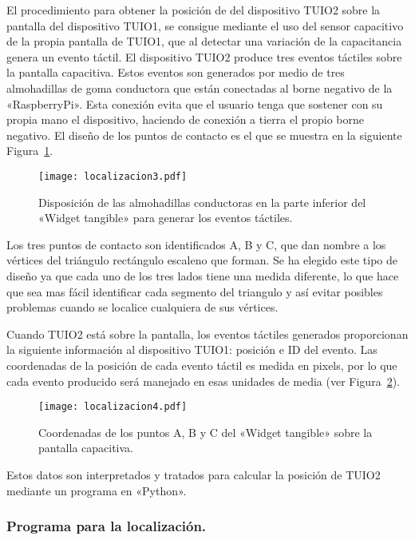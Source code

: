 El procedimiento para obtener la posición de del dispositivo TUIO2 sobre la pantalla del dispositivo TUIO1, se consigue mediante el uso del sensor capacitivo de la propia pantalla de TUIO1, que al detectar una variación de la capacitancia genera un evento táctil.
El dispositivo TUIO2 produce tres eventos táctiles sobre la pantalla capacitiva. Estos eventos son generados por medio de tres almohadillas de goma conductora que están conectadas al borne negativo de la «RaspberryPi». Esta conexión evita que el usuario tenga que sostener con su propia mano el dispositivo, haciendo de conexión a tierra el propio borne negativo.
El diseño de los puntos de contacto es el que se muestra en la siguiente Figura~\ref{fig:Localizacion3}.
\begin{figure}[!h]
\begin{center}
\texttt{[image: localizacion3.pdf]}
\caption{Disposición de las almohadillas conductoras en la parte inferior del «Widget tangible» para generar los eventos táctiles. }
\label{fig:Localizacion3}
\end{center}
\end{figure}
Los tres puntos de contacto son identificados A, B y C, que dan nombre a los vértices del triángulo rectángulo escaleno que forman. Se ha elegido este tipo de diseño ya que cada uno de los tres lados tiene una medida diferente, lo que hace que sea mas fácil identificar cada segmento del triangulo y así evitar posibles problemas cuando se localice cualquiera de sus vértices.

Cuando TUIO2 está sobre la pantalla, los eventos táctiles generados proporcionan la siguiente información al dispositivo TUIO1: posición e ID del evento. Las coordenadas de la posición de cada evento táctil es medida en pixels, por lo que cada evento producido será manejado en esas unidades de media (ver Figura~\ref{fig:Localizacion4}).\\
\begin{figure}[!h]
\begin{center}
\texttt{[image: localizacion4.pdf]}
\caption{Coordenadas de los puntos A, B y C del «Widget tangible» sobre la pantalla capacitiva. }
\label{fig:Localizacion4}
\end{center}
\end{figure}
Estos datos son interpretados y tratados para calcular la posición de TUIO2 mediante un programa en «Python».

\subsubsection{Programa para la localización.}

